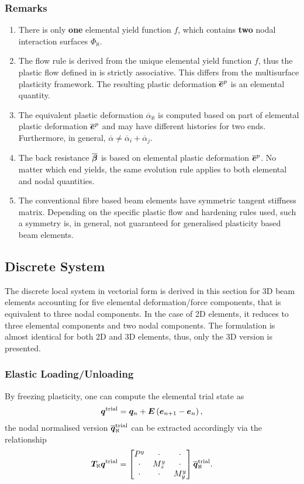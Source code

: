\subsubsection{Remarks}
\begin{enumerate}
\item There is only \textbf{one} elemental yield function $f$, which contains \textbf{two} nodal interaction surfaces $\Phi_\aleph$.
\item The flow rule is derived from the unique elemental yield function $f$, thus the plastic flow defined in  is strictly associative.
This differs from the multisurface plasticity framework.
The resulting plastic deformation $\overline{\bm{e}}^p$ is an elemental quantity.
\item The equivalent plastic deformation $\overline{\alpha}_\aleph$ is computed based on part of elemental plastic deformation $\overline{\bm{e}}^p$ and may have different histories for two ends.
Furthermore, in general, $\overline{\alpha}\neq\overline{\alpha}_i+\overline{\alpha}_j$.
\item The back resistance $\overline{\bm{\beta}}$ is based on elemental plastic deformation $\overline{\bm{e}}^p$.
No matter which end yields, the same evolution rule applies to both elemental and nodal quantities.
\item The conventional fibre based beam elements have symmetric tangent stiffness matrix.
Depending on the specific plastic flow and hardening rules used, such a symmetry is, in general, not guaranteed for generalised plasticity based beam elements.
\end{enumerate}
\subsection{Discrete System}
The discrete local system in vectorial form is derived in this section for 3D beam elements accounting for five elemental deformation/force components, that is equivalent to three nodal components.
In the case of 2D elements, it reduces to three elemental components and two nodal components.
The formulation is almost identical for both 2D and 3D elements, thus, only the 3D version is presented.
\subsubsection{Elastic Loading/Unloading}
By freezing plasticity, one can compute the elemental trial state as
\begin{gather}\label{eq:nm_qa}
\bm{q}^\text{trial}=\bm{q}_n+\bm{E}\left(\bm{e}_{n+1}-\bm{e}_n\right),
\end{gather}
the nodal normalised version $\bm{\overline{q}}_\aleph^\text{trial}$ can be extracted accordingly via the relationship
\begin{gather}\label{eq:nm_qb}
\bm{T}_\aleph\bm{q}^\text{trial}=\begin{bmatrix}
P^y&\cdot&\cdot\\\cdot&M_z^y&\cdot\\\cdot&\cdot&M_y^y
\end{bmatrix}\bm{\overline{q}}_\aleph^\text{trial}.
\end{gather}

